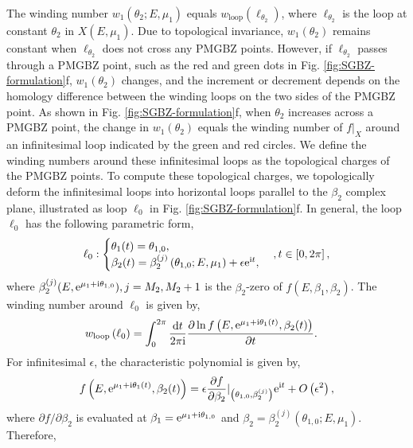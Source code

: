 The winding number $w_{1}(\theta_{2};E,\mu_{1})$ equals $w_{\text{loop}}(\ell_{\theta_{2}})$,
where $\ell_{\theta_{2}}$ is the loop at constant $\theta_{2}$ in
$X(E,\mu_{1})$. Due to topological invariance, $w_{1}(\theta_{2})$
remains constant when $\ell_{\theta_{2}}$ does not cross any PMGBZ
points. However, if $\ell_{\theta_{2}}$ passes through a PMGBZ point,
such as the red and green dots in Fig. \ref{fig:SGBZ-formulation}f,
$w_{1}(\theta_{2})$ changes, and the increment or decrement depends
on the homology difference between the winding loops on the two sides
of the PMGBZ point. As shown in Fig. \ref{fig:SGBZ-formulation}f,
when $\theta_{2}$ increases across a PMGBZ point, the change in $w_{1}(\theta_{2})$
equals the winding number of $f|_{X}$ around an infinitesimal loop
indicated by the green and red circles. We define the winding numbers
around these infinitesimal loops as the topological charges of the
PMGBZ points. To compute these topological charges, we topologically
deform the infinitesimal loops into horizontal loops parallel to the
$\beta_{2}$ complex plane, illustrated as loop $\ell_{0}$ in Fig.
\ref{fig:SGBZ-formulation}f. In general, the loop $\ell_{0}$ has
the following parametric form, 
\begin{equation}
\ell_{0}:\begin{cases}
\theta_{1}(t)=\theta_{1,0},\\
\beta_{2}(t)=\beta_{2}^{(j)}\left(\theta_{1,0};E,\mu_{1}\right)+\epsilon\mathrm{e}^{\mathrm{i} t},
\end{cases},t\in\left[0,2\pi\right],
\end{equation}
where $\beta_{2}^{(j)}(E,\mathrm{e}^{\mu_{1}+\mathrm{i}\theta_{1,0}}),j=M_{2},M_{2}+1$
is the $\beta_{2}$-zero of $f(E,\beta_{1},\beta_{2})$. The winding
number around $\ell_{0}$ is given by, 
\begin{align}
w_{\text{loop}}\left(\ell_{0}\right) & =\int_{0}^{2\pi}\frac{\mathrm{d} t}{2\pi\mathrm{i}}\frac{\partial\ln f\left(E,\mathrm{e}^{\mu_{1}+\mathrm{i}\theta_{1}(t)},\beta_{2}(t)\right)}{\partial t}.
\end{align}
For infinitesimal $\epsilon$, the characteristic polynomial is given
by, 
\begin{equation}
f\left(E,\mathrm{e}^{\mu_{1}+\mathrm{i}\theta_{1}(t)},\beta_{2}(t)\right)=\epsilon\frac{\partial f}{\partial\beta_{2}}|_{\left(\theta_{1,0},\beta_{2}^{(j)}\right)}\mathrm{e}^{\mathrm{i} t}+O\left(\epsilon^{2}\right),
\end{equation}
where $\partial f/\partial\beta_{2}$ is evaluated at $\beta_{1}=\mathrm{e}^{\mu_{1}+\mathrm{i}\theta_{1,0}}$
and $\beta_{2}=\beta_{2}^{(j)}(\theta_{1,0};E,\mu_{1})$. Therefore,
